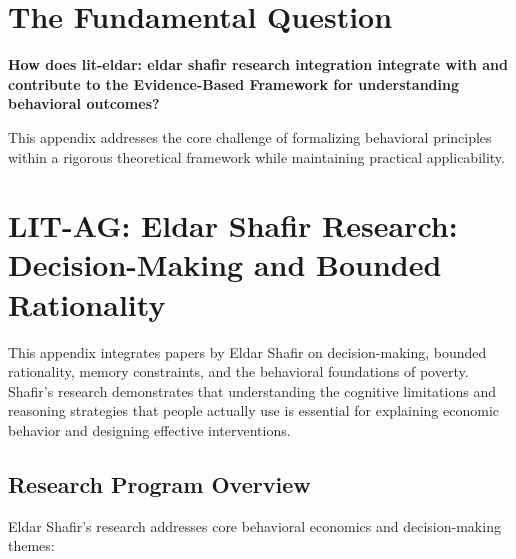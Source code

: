 \section{The Fundamental Question}
\label{sec:sha-fundamental}

\begin{tcolorbox}[
    colback=red!5!white,
    colframe=red!75!black,
    title={\textbf{Fundamental Question}}
]
\textbf{How does lit-eldar: eldar shafir research integration integrate with and contribute to the
Evidence-Based Framework for understanding behavioral outcomes?}

This appendix addresses the core challenge of formalizing behavioral principles
within a rigorous theoretical framework while maintaining practical applicability.
\end{tcolorbox}





\section{LIT-AG: Eldar Shafir Research: Decision-Making and Bounded Rationality}
\label{app:litag}

This appendix integrates papers by Eldar Shafir on decision-making, bounded rationality, memory constraints, and the behavioral foundations of poverty. Shafir's research demonstrates that understanding the cognitive limitations and reasoning strategies that people actually use is essential for explaining economic behavior and designing effective interventions.

\subsection{Research Program Overview}

Eldar Shafir's research addresses core behavioral economics and decision-making themes:

